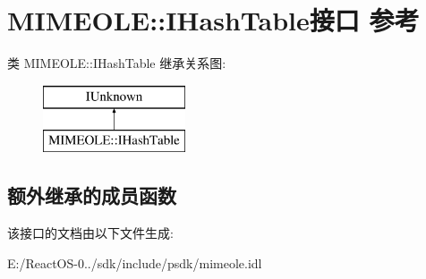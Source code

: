 \hypertarget{interface_m_i_m_e_o_l_e_1_1_i_hash_table}{}\section{M\+I\+M\+E\+O\+LE\+:\+:I\+Hash\+Table接口 参考}
\label{interface_m_i_m_e_o_l_e_1_1_i_hash_table}
类 M\+I\+M\+E\+O\+LE\+:\+:I\+Hash\+Table 继承关系图\+:\begin{figure}[H]
\begin{center}
\leavevmode
\includegraphics[height=2.000000cm]{interface_m_i_m_e_o_l_e_1_1_i_hash_table}
\end{center}
\end{figure}
\subsection*{额外继承的成员函数}


该接口的文档由以下文件生成\+:\begin{DoxyCompactItemize}
\item 
E\+:/\+React\+O\+S-\/0../sdk/include/psdk/mimeole.\+idl\end{DoxyCompactItemize}
